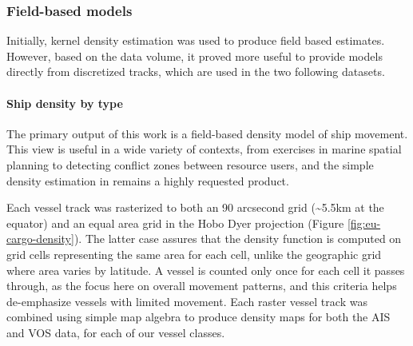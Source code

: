 
\subsubsection{Field-based models}

Initially, kernel density estimation was used to produce field based estimates. However, based on the data volume, it proved more useful to provide models directly from discretized tracks, which are used in the two following datasets.

\paragraph{Ship density by type}

The primary output of this work is a field-based density model of ship movement. This view is useful in a wide variety of contexts, from exercises in marine spatial planning to detecting conflict zones between resource users, and the simple density estimation in \cite{Halpern2008} remains a highly requested product. %

Each vessel track was rasterized to both an 90 arcsecond grid (\textasciitilde{}5.5km at the equator) and an equal area grid in the Hobo Dyer projection (Figure \ref{fig:eu-cargo-density}). The latter case assures that the density function is computed on grid cells representing the same area for each cell, unlike the geographic grid where area varies by latitude. A vessel is counted only once for each cell it passes through, as the focus here on overall movement patterns, and this criteria helps de-emphasize vessels with limited movement. Each raster vessel track was combined using simple map algebra to produce density maps for both the AIS and VOS data, for each of our vessel classes. %

